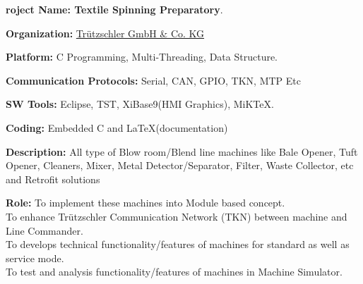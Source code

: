 \begin{itemize}
\vspace{2mm}
\hspace{-10mm} \textbf{\large {\faProductHunt}roject Name: Textile Spinning Preparatory}.\par
    \textbf{Organization:} \href{https://www.truetzschler.de/en/locations/production-worldwide/india/company-profile/}{Trützschler GmbH \& Co. KG}\par  \textbf{Platform:} C Programming, Multi-Threading, Data Structure.\par
    \textbf{Communication Protocols:} Serial, CAN, GPIO, TKN, MTP Etc\par
    \textbf{SW Tools:} Eclipse, TST, XiBase9(HMI Graphics), MiKTeX.\par
    \textbf{Coding:} Embedded C and \LaTeX(documentation) \par
    \textbf{Description:} All type of Blow room/Blend line machines like Bale Opener, Tuft Opener, Cleaners, Mixer, Metal Detector/Separator, Filter, Waste Collector, etc and Retrofit solutions\par
    \textbf{Role:} To implement these machines into Module based concept. \\To enhance Trützschler Communication Network (TKN) between machine and Line Commander. \\To develops technical functionality/features of machines for standard as well as service mode. \\To test and analysis functionality/features of machines in Machine Simulator.


\end{itemize}
